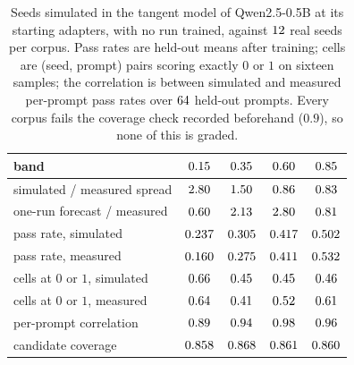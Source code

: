 \begin{table}[t]
  \centering \footnotesize
  \setlength{\tabcolsep}{3pt}
  \begin{tabular}{@{}lcccc@{}}
    \toprule
    band & $0.15$ & $0.35$
         & $0.60$ & $0.85$ \\
    \midrule
    simulated / measured spread & $2.80$ & $1.50$
         & $0.86$ & $0.83$ \\
    one-run forecast / measured & $0.60$
         & $2.13$ & $2.80$
         & $0.81$ \\
    pass rate, simulated & $0.237$ & $0.305$
         & $0.417$ & $0.502$ \\
    pass rate, measured & $0.160$
         & $0.275$ & $0.411$
         & $0.532$ \\
    cells at $0$ or $1$, simulated & $0.66$
         & $0.45$ & $0.45$
         & $0.46$ \\
    cells at $0$ or $1$, measured & $0.64$
         & $0.41$ & $0.52$
         & $0.61$ \\
    per-prompt correlation & $0.89$
         & $0.94$ & $0.98$
         & $0.96$ \\
    candidate coverage & $0.858$ & $0.868$
         & $0.861$ & $0.860$ \\
    \bottomrule
  \end{tabular}
  \caption{Seeds simulated in the tangent model of Qwen2.5-0.5B at its starting adapters, with no
  run trained, against $12$ real seeds per corpus. Pass rates are held-out
  means after training; cells are (seed, prompt) pairs scoring exactly $0$ or $1$ on sixteen
  samples; the correlation is between simulated and measured per-prompt pass rates over
  $64$ held-out prompts. Every corpus fails the coverage check recorded
  beforehand ($0.9$), so none of this is graded.}
  \label{tab:real-tangent}
\end{table}

